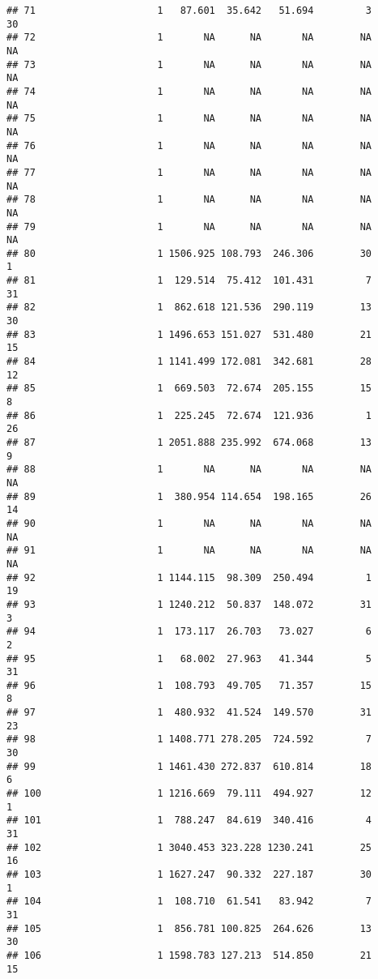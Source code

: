 \documentclass[
]{article}
\begin{document}
\begin{verbatim}
## 71                     1   87.601  35.642   51.694         3        30
## 72                     1       NA      NA       NA        NA        NA
## 73                     1       NA      NA       NA        NA        NA
## 74                     1       NA      NA       NA        NA        NA
## 75                     1       NA      NA       NA        NA        NA
## 76                     1       NA      NA       NA        NA        NA
## 77                     1       NA      NA       NA        NA        NA
## 78                     1       NA      NA       NA        NA        NA
## 79                     1       NA      NA       NA        NA        NA
## 80                     1 1506.925 108.793  246.306        30         1
## 81                     1  129.514  75.412  101.431         7        31
## 82                     1  862.618 121.536  290.119        13        30
## 83                     1 1496.653 151.027  531.480        21        15
## 84                     1 1141.499 172.081  342.681        28        12
## 85                     1  669.503  72.674  205.155        15         8
## 86                     1  225.245  72.674  121.936         1        26
## 87                     1 2051.888 235.992  674.068        13         9
## 88                     1       NA      NA       NA        NA        NA
## 89                     1  380.954 114.654  198.165        26        14
## 90                     1       NA      NA       NA        NA        NA
## 91                     1       NA      NA       NA        NA        NA
## 92                     1 1144.115  98.309  250.494         1        19
## 93                     1 1240.212  50.837  148.072        31         3
## 94                     1  173.117  26.703   73.027         6         2
## 95                     1   68.002  27.963   41.344         5        31
## 96                     1  108.793  49.705   71.357        15         8
## 97                     1  480.932  41.524  149.570        31        23
## 98                     1 1408.771 278.205  724.592         7        30
## 99                     1 1461.430 272.837  610.814        18         6
## 100                    1 1216.669  79.111  494.927        12         1
## 101                    1  788.247  84.619  340.416         4        31
## 102                    1 3040.453 323.228 1230.241        25        16
## 103                    1 1627.247  90.332  227.187        30         1
## 104                    1  108.710  61.541   83.942         7        31
## 105                    1  856.781 100.825  264.626        13        30
## 106                    1 1598.783 127.213  514.850        21        15

\end{verbatim}
\end{document}
